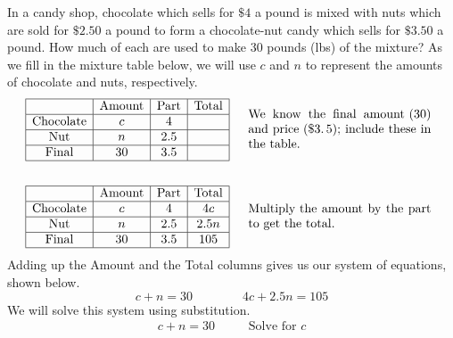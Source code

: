 \begin{example}  
  In a candy shop, chocolate which sells for $\$4$ a pound is mixed
  with nuts which are sold for $\$2.50$ a pound to form a
  chocolate-nut candy which sells for $\$3.50$ a pound. How much of
  each are used to make 30 pounds (lbs) of the mixture?\pp
	As we fill in the mixture table below, we will use $c$ and $n$ to represent the amounts of chocolate and nuts, respectively.
		\begin{eqnarray*}
    \begin{array}{|c|c|c|c|}
      \hline
      & \tmop{Amount} & \tmop{Part} & \tmop{Total}\\
      \hline
      \tmop{Chocolate} & c & 4 & \\
      \hline
      \tmop{Nut} & n & 2.5 & \\
      \hline
      \tmop{Final} & 30 & 3.5 & \\
      \hline
    \end{array} &  & \begin{array}{p{0.425\textwidth}}
      \tmop{We} \tmop{know} \tmop{the} \tmop{final} \tmop{amount~(30)}
      \tmop{and} \tmop{price~(\$3.5)};
      \tmop{include} \tmop{these} \tmop{in} \tmop{the} \tmop{table}.
    \end{array}\\
    &  & \\
    \begin{array}{|c|c|c|c|}
      \hline
      & \tmop{Amount} & \tmop{Part} & \tmop{Total}\\
      \hline
      \tmop{Chocolate} & c & 4 & 4 c\\
      \hline
      \tmop{Nut} & n & 2.5 & 2.5 n\\
      \hline
      \tmop{Final} & 30 & 3.5 & 105\\
      \hline
    \end{array} &  & \begin{array}{p{0.425\textwidth}}
			\tmop{Multiply~the} \tmop{amount} \tmop{by} \tmop{the} \tmop{part} \tmop{to} \tmop{get}
      \tmop{the~total}.
    \end{array}%
  \end{eqnarray*}
Adding up the Amount and the Total columns gives us our system of equations, shown below.
$$c+n=30\qquad\qquad 4 c + 2.5 n = 105$$
We will solve this system using substitution. 	
\begin{eqnarray*}
    c + n = 30~~~~~ &  & \text{Solve~for~} c\\

\end{eqnarray*}
\end{example}
